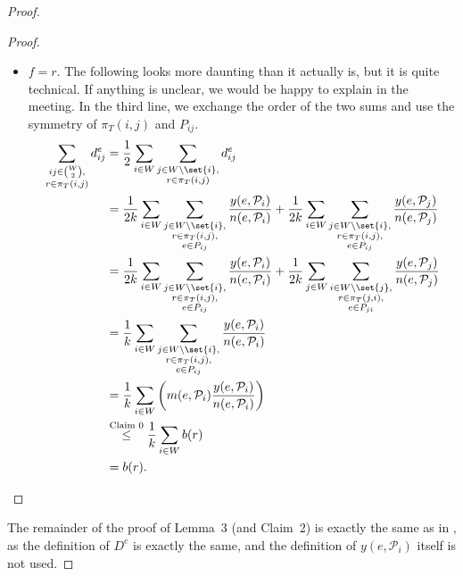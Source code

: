\documentclass[11pt]{article}
\theoremstyle{definition}
\begin{document}
\begin{proof}
\begin{proof}
\begin{itemize}
                \item $f = r$.
                The following looks more daunting than it actually is, but it is quite technical.
                If anything is unclear, we would be happy to explain in the meeting.
                In the third line, we exchange the order of the two sums and use the symmetry of $\pi_T(i, j)$ and $P_{ij}$.
                \[
                    \begin{split}
                        \sum_{\substack{ij \in \binom{W}{2},\\r \in \pi_T(i,j)}} d^e_{ij} &= \frac 1 2 \sum_{i \in W} \sum_{\substack{j \in W \setminus \set{i},\\r \in \pi_T(i,j)}} d^e_{ij} \\
                        &= \frac{1}{2k} \sum_{i \in W} \sum_{\substack{j \in W \setminus \set{i},\\r \in \pi_T(i,j),\\e \in P_{ij}}} \frac{y(e, \mathcal P_i)}{n(e, \mathcal P_i)} + \frac{1}{2k} \sum_{i \in W} \sum_{\substack{j \in W \setminus \set{i},\\r \in \pi_T(i,j),\\e \in P_{ij}}} \frac{y(e, \mathcal P_j)}{n(e, \mathcal P_j)} \\
                        &= \frac{1}{2k} \sum_{i \in W} \sum_{\substack{j \in W \setminus \set{i},\\r \in \pi_T(i,j),\\e \in P_{ij}}} \frac{y(e, \mathcal P_i)}{n(e, \mathcal P_i)} + \frac{1}{2k} \sum_{j \in W} \sum_{\substack{i \in W \setminus \set{j},\\r \in \pi_T(j,i),\\e \in P_{ji}}} \frac{y(e, \mathcal P_j)}{n(e, \mathcal P_j)} \\
                        &= \frac{1}{k} \sum_{i \in W} \sum_{\substack{j \in W \setminus \set{i},\\r \in \pi_T(i,j),\\e \in P_{ij}}} \frac{y(e, \mathcal P_i)}{n(e, \mathcal P_i)} \\
                        &= \frac{1}{k} \sum_{i \in W} \left( m(e, \mathcal P_i) \frac{y(e, \mathcal P_i)}{n(e, \mathcal P_i)} \right) \\
                        &\stackrel{\text{Claim 0}}{\le} \frac{1}{k} \sum_{i \in W} b(r) \\
                        &= b(r).
                    \end{split}
                \] \qedhere
            \end{itemize}

        \end{proof}
        The remainder of the proof of Lemma~3 (and Claim~2) is exactly the same as in \cite{grandoni2008short}, as the definition of $D^e$ is exactly the same, and the definition of $y(e, \mathcal P_i)$ itself is not used.
    \end{proof}
\end{document}
